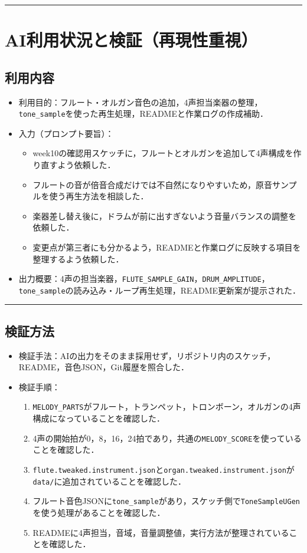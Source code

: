 \documentclass[uplatex,dvipdfmx,a4paper,11pt]{jsarticle}
\newcommand{\sectionrule}{\par\medskip\noindent\rule{\linewidth}{0.6pt}\par\medskip}
\begin{document}
\sectionrule

\section{AI利用状況と検証（再現性重視）}

\subsection{利用内容}

\begin{itemize}
  \item 利用目的：フルート・オルガン音色の追加，4声担当楽器の整理，\texttt{tone\_sample}を使った再生処理，READMEと作業ログの作成補助．
  \item 入力（プロンプト要旨）：
    \begin{itemize}
      \item {}week10の確認用スケッチに，フルートとオルガンを追加して4声構成を作り直すよう依頼した．
      \item {}フルートの音が倍音合成だけでは不自然になりやすいため，原音サンプルを使う再生方法を相談した．
      \item {}楽器差し替え後に，ドラムが前に出すぎないよう音量バランスの調整を依頼した．
      \item {}変更点が第三者にも分かるよう，READMEと作業ログに反映する項目を整理するよう依頼した．
    \end{itemize}
  \item 出力概要：4声の担当楽器，\texttt{FLUTE\_SAMPLE\_GAIN}，\texttt{DRUM\_AMPLITUDE}，\texttt{tone\_sample}の読み込み・ループ再生処理，README更新案が提示された．
\end{itemize}

\sectionrule

\subsection{検証方法}

\begin{itemize}
  \item 検証手法：AIの出力をそのまま採用せず，リポジトリ内のスケッチ，README，音色JSON，Git履歴を照合した．
  \item 検証手順：
    \begin{enumerate}
      \item {}\texttt{MELODY\_PARTS}がフルート，トランペット，トロンボーン，オルガンの4声構成になっていることを確認した．
      \item {}4声の開始拍が0，8，16，24拍であり，共通の\texttt{MELODY\_SCORE}を使っていることを確認した．
      \item {}\texttt{flute.tweaked.instrument.json}と\texttt{organ.tweaked.instrument.json}が\texttt{data/}に追加されていることを確認した．
      \item {}フルート音色JSONに\texttt{tone\_sample}があり，スケッチ側で\texttt{ToneSampleUGen}を使う処理があることを確認した．
      \item {}READMEに4声担当，音域，音量調整値，実行方法が整理されていることを確認した．
    \end{enumerate}
\end{itemize}
\end{document}
